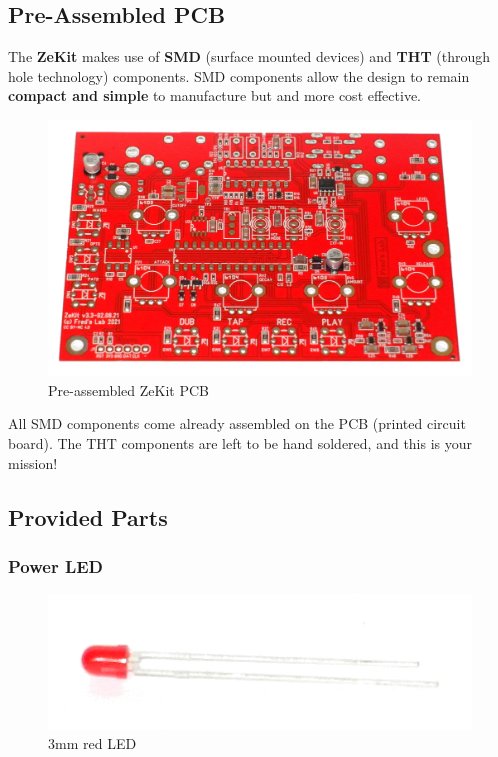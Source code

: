 \documentclass{scrartcl}
\begin{document}
\pagebreak
\subsection{Pre-Assembled PCB}

The \textbf{ZeKit} makes use of \textbf{SMD} (surface mounted devices) and \textbf{THT} (through hole technology) components. SMD components allow the design to remain \textbf{compact and simple} to manufacture but and more cost effective.

\begin{figure}[!ht]
    \begin{center}
        \includegraphics[scale=0.10]{assets/zekit-unassembled.jpg}
        \caption{Pre-assembled ZeKit PCB}
    \end{center}
\end{figure}

All SMD components come already assembled on the PCB (printed circuit board). The THT components are left to be hand soldered, and this is your mission!

\subsection{Provided Parts}

\subsubsection{Power LED}

\begin{figure}[!ht]
    \begin{center}
        \includegraphics[scale=0.15]{assets/zekit-led.jpg}
        \caption{3mm red LED}
    \end{center}
\end{figure}
\end{document}
